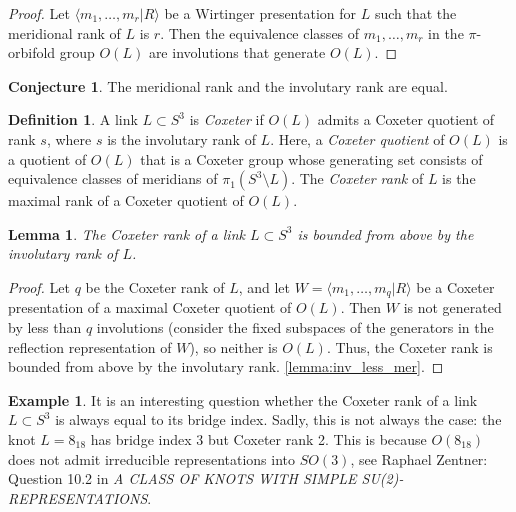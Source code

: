 \documentclass[11pt]{article}
\newtheorem{lemma}[theorem]{Lemma}
\theoremstyle{definition}
\newtheorem{definition}[theorem]{Definition}
\newtheorem{example}[theorem]{Example}
\newtheorem{conjecture}[theorem]{Conjecture}
\begin{document}
\begin{proof}
Let $\langle m_1, \dots, m_r | R\rangle$ be a Wirtinger presentation for $L$ such that the meridional rank of $L$ is $r$. Then the equivalence classes of $m_1, \dots, m_r$ in the $\pi$-orbifold group $O(L)$ are involutions that generate $O(L)$.
\end{proof}

\begin{conjecture}
The meridional rank and the involutary rank are equal.
\end{conjecture}

\begin{definition}
A link $L \subset S^3$ is \textit{Coxeter} if $O(L)$ admits a Coxeter quotient of rank $s$, where $s$ is the involutary rank of $L$. Here, a \textit{Coxeter quotient} of $O(L)$ is a quotient of $O(L)$ that is a Coxeter group whose generating set consists of equivalence classes of meridians of $\pi_1(S^3 \setminus L)$. The \textit{Coxeter rank} of $L$ is the maximal rank of a Coxeter quotient of $O(L)$.
\end{definition}

\begin{lemma}
The Coxeter rank of a link $L \subset S^3$ is bounded from above by the involutary rank of $L$.
\end{lemma}

\begin{proof}
Let $q$ be the Coxeter rank of $L$, and let $W = \langle m_1, \dots, m_q | R \rangle$ be a Coxeter presentation of a maximal Coxeter quotient of $O(L)$. Then $W$ is not generated by less than $q$ involutions (consider the fixed subspaces of the generators in the reflection representation of $W$), so neither is $O(L)$. Thus, the Coxeter rank is bounded from above by the involutary rank. \ref{lemma:inv_less_mer}.
\end{proof}

\begin{example}
It is an interesting question whether the Coxeter rank of a link $L\subset S^3$ is always equal to its bridge index. Sadly, this is not always the case: the knot $L = 8_{18}$ has bridge index 3 but Coxeter rank 2. This is because $O(8_{18})$ does not admit irreducible representations into $SO(3)$, see Raphael Zentner: Question 10.2 in \textit{A CLASS OF KNOTS WITH SIMPLE SU(2)-REPRESENTATIONS}.
\end{example}
\end{document}
